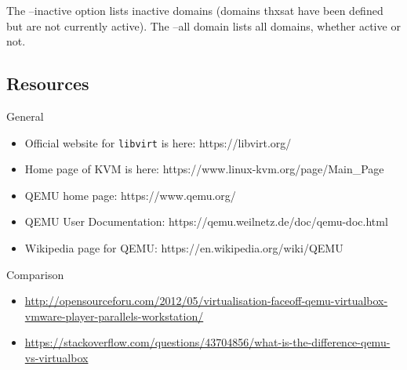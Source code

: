 The --inactive option lists inactive domains (domains thxsat have been
defined but are not currently active). The --all domain lists all
domains, whether active or not.

\subsection{Resources}

General

\begin{itemize}
\item
  Official website for \texttt{libvirt} is here: https://libvirt.org/
\item
  Home page of KVM is here: https://www.linux-kvm.org/page/Main\_Page
\item
  QEMU home page: https://www.qemu.org/
\item
  QEMU User Documentation: https://qemu.weilnetz.de/doc/qemu-doc.html
\item
  Wikipedia page for QEMU: https://en.wikipedia.org/wiki/QEMU
\end{itemize}

Comparison

\begin{itemize}
\item
  \url{http://opensourceforu.com/2012/05/virtualisation-faceoff-qemu-virtualbox-vmware-player-parallels-workstation/}
\item
  \url{https://stackoverflow.com/questions/43704856/what-is-the-difference-qemu-vs-virtualbox}
\end{itemize}

